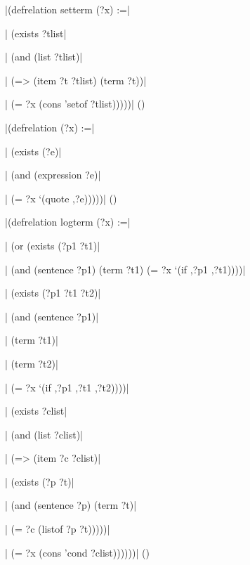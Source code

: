 \medskip
\verbatim|(defrelation setterm (?x) :=|\par
\verbatim|  (exists ?tlist|\par
\verbatim|    (and (list ?tlist)|\par
\verbatim|         (=> (item ?t  ?tlist) (term ?t))|\par
\verbatim|         (= ?x (cons 'setof ?tlist)))))|
\hfill(\equation)\par
\medskip

\medskip
\verbatim|(defrelation (?x) :=|\par
\verbatim|  (exists (?e)|\par
\verbatim|    (and (expression ?e)|\par
\verbatim|         (= ?x `(quote ,?e)))))|
\hfill(\equation)\par
\medskip

\medskip
\verbatim|(defrelation logterm (?x) :=|\par
\verbatim|  (or (exists (?p1 ?t1)|\par
\verbatim|        (and (sentence ?p1) (term ?t1) (= ?x `(if ,?p1 ,?t1))))|\par
\verbatim|      (exists (?p1 ?t1 ?t2)|\par
\verbatim|        (and (sentence ?p1)|\par
\verbatim|             (term ?t1)|\par
\verbatim|             (term ?t2)|\par
\verbatim|             (= ?x `(if ,?p1 ,?t1 ,?t2))))|\par
\verbatim|      (exists ?clist|\par
\verbatim|        (and (list ?clist)|\par
\verbatim|             (=> (item ?c ?clist)|\par
\verbatim|                 (exists (?p ?t)|\par
\verbatim|                   (and (sentence ?p) (term ?t)|\par
\verbatim|                        (= ?c (listof ?p ?t)))))|\par
\verbatim|             (= ?x (cons 'cond ?clist))))))|
\hfill(\equation)\par
\medskip

